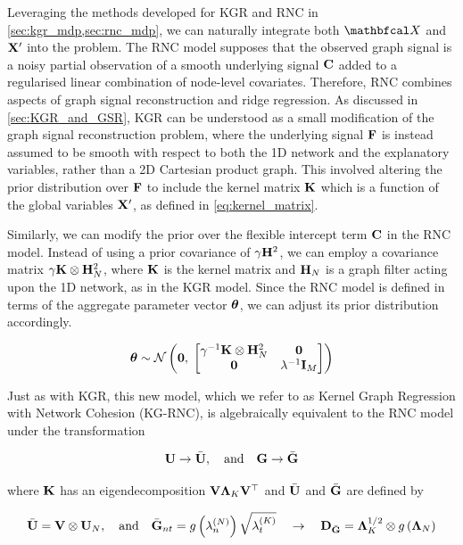 Leveraging the methods developed for KGR and RNC in \cref{sec:kgr_mdp,sec:rnc_mdp}, we can naturally integrate both $\Xt$ and $\mathbf{X}'$ into the problem. The RNC model supposes that the observed graph signal is a noisy partial observation of a smooth underlying signal $\mathbf{C}$ added to a regularised linear combination of node-level covariates. Therefore, RNC combines aspects of graph signal reconstruction and ridge regression. As discussed in \cref{sec:KGR_and_GSR}, KGR can be understood as a small modification of the graph signal reconstruction problem, where the underlying signal $\mathbf{F}$ is instead assumed to be smooth with respect to both the 1D network and the explanatory variables, rather than a 2D Cartesian product graph. This involved altering the prior distribution over $\mathbf{F}$ to include the kernel matrix $\mathbf{K}$ which is a function of the global variables $\mathbf{X}'$, as defined in \cref{eq:kernel_matrix}. 

Similarly, we can modify the prior over the flexible intercept term $\mathbf{C}$ in the RNC model. Instead of using a prior covariance of $\gamma \mathbf{H}^2$, we can employ a covariance matrix $\gamma \mathbf{K} \otimes \mathbf{H}_N^2$, where $\mathbf{K}$ is the kernel matrix and $\mathbf{H}_N$ is a graph filter acting upon the 1D network, as in the KGR model. Since the RNC model is defined in terms of the aggregate parameter vector $\boldsymbol{\theta}$, we can adjust its prior distribution accordingly.

\begin{equation}
    \label{eq:theta_prior2}
    \boldsymbol{\theta} \sim \mathcal{N}\left( \mathbf{0}, \; \begin{bmatrix} \gamma^{-1} \mathbf{K} \otimes \mathbf{H}_N^2 & \mathbf{0} \\ \mathbf{0} & \lambda^{-1} \mathbf{I}_M \end{bmatrix} \right)
\end{equation}

Just as with KGR, this new model, which we refer to as Kernel Graph Regression with Network Cohesion (KG-RNC), is algebraically equivalent to the RNC model under the transformation 

$$
\mathbf{U} \rightarrow \bar{\mathbf{U}}, \quad \text{and} \quad \mathbf{G} \rightarrow \bar{\mathbf{G}}
$$

where $\mathbf{K}$ has an eigendecomposition $\mathbf{V} \mathbf{\Lambda}_K \mathbf{V}^\top$ and $\bar{\mathbf{U}}$ and $\bar{\mathbf{G}}$ are defined by

$$
\bar{\mathbf{U}} = \mathbf{V} \otimes \mathbf{U}_N, \quad \text{and} \quad     \bar{\mathbf{G}}_{nt} = g\left(\lambda^{(N)}_n\right) \sqrt{\lambda^{(K)}_t} \quad \rightarrow \quad \mathbf{D}_{\bar{\mathbf{G}}} = \mathbf{\Lambda}_K^{1/2} \otimes g\left(\mathbf{\Lambda}_N\right) 
$$

